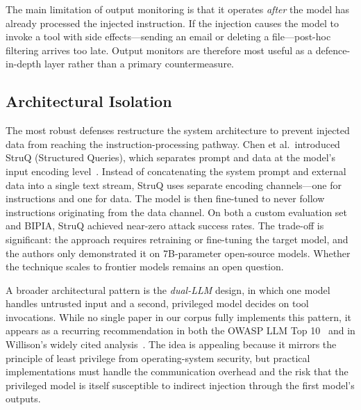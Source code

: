 The main limitation of output monitoring is that it operates \emph{after} the model has already processed the injected instruction. If the injection causes the model to invoke a tool with side effects---sending an email or deleting a file---post-hoc filtering arrives too late. Output monitors are therefore most useful as a defence-in-depth layer rather than a primary countermeasure.

\subsection{Architectural Isolation}

The most robust defenses restructure the system architecture to prevent injected data from reaching the instruction-processing pathway. Chen et al.\ introduced StruQ (Structured Queries), which separates prompt and data at the model's input encoding level~\cite{chen2024struq}. Instead of concatenating the system prompt and external data into a single text stream, StruQ uses separate encoding channels---one for instructions and one for data. The model is then fine-tuned to never follow instructions originating from the data channel. On both a custom evaluation set and BIPIA, StruQ achieved near-zero attack success rates. The trade-off is significant: the approach requires retraining or fine-tuning the target model, and the authors only demonstrated it on 7B-parameter open-source models. Whether the technique scales to frontier models remains an open question.

A broader architectural pattern is the \emph{dual-LLM} design, in which one model handles untrusted input and a second, privileged model decides on tool invocations. While no single paper in our corpus fully implements this pattern, it appears as a recurring recommendation in both the OWASP LLM Top 10~\cite{owasp2025llm} and in Willison's widely cited analysis~\cite{willison2023prompt}. The idea is appealing because it mirrors the principle of least privilege from operating-system security, but practical implementations must handle the communication overhead and the risk that the privileged model is itself susceptible to indirect injection through the first model's outputs.
